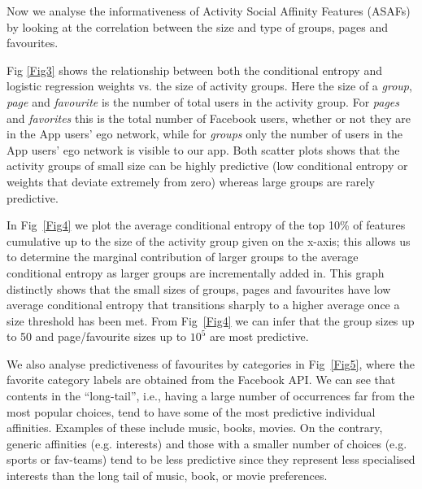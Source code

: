 


Now we analyse the informativeness of Activity Social Affinity
Features (ASAFs) by looking at the correlation between the size and
type of groups, pages and favourites.

Fig \ref{Fig3} shows the relationship between both the conditional
    entropy and logistic regression weights vs. the size of activity
    groups. Here the size of a {\em group}, {\em page} and {\em favourite} 
    is the number of total users in the activity group. 
    For {\em pages} and {\em favorites} this is the total number of Facebook users, 
    whether or not they are in the App users' ego network, while for 
    {\em groups} only the number of users in the App users' ego network is visible to our app.
    Both scatter plots shows that the activity groups of small size can be
    highly predictive (low conditional entropy or weights that deviate
    extremely from zero) whereas large groups are rarely predictive.

In Fig~\ref{Fig4} we plot the average conditional entropy of the top
    10\% of features cumulative up to the size of the activity group given on the
    x-axis; this allows us to determine the marginal contribution of
    larger groups to the average conditional entropy as larger groups
    are incrementally added in.  This graph 
    distinctly shows that the small sizes of groups, pages and favourites
    have low average conditional entropy that transitions sharply to a
    higher average once a size threshold has been met.  From 
    Fig~\ref{Fig4} we can infer that the group sizes up to 50 and
    page/favourite sizes up to $10^{5}$ are most predictive.


 We also analyse predictiveness of favourites by categories in
    Fig~\ref{Fig5}, where the favorite category labels are obtained from the Facebook API.  
    We can see that contents in the ``long-tail'', i.e.,  
    having a large number of occurrences far from the most popular choices, 
    tend to have some of the most predictive individual affinities. Examples of these include
    music, books, movies. On the contrary, generic affinities (e.g. interests) and 
    those with a smaller number of choices (e.g. sports or fav-teams) 
    tend to be less predictive since they represent less specialised interests than 
    the long tail of music, book, or movie preferences.  

